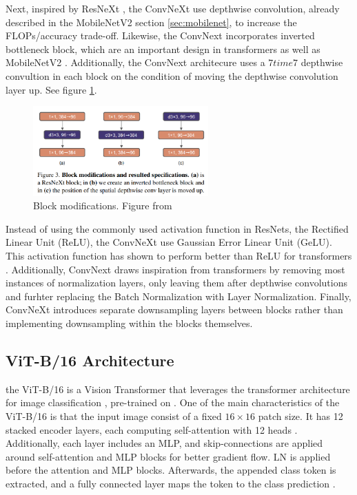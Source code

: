 Next, inspired by ResNeXt \cite{xie2017aggregatedresidualtransformationsdeep}, the ConvNeXt use depthwise convolution, already described in the MobileNetV2 section \ref{sec:mobilenet}, to increase the FLOPs/accuracy trade-off. Likewise, the ConvNext incorporates inverted bottleneck block, which are an important design in transformers as well as MobileNetV2 \cite{liu2022convnet2020s}. Additionally, the ConvNext architecure uses a $7 time 7$ depthwise convultion in each block on the condition of moving the depthwise convolution layer up. See figure \ref{fig:conv_block}.

\begin{figure}[h!]
    \centering
    \includegraphics[width=0.6\textwidth]{Images/convnext_block_mod.png} 
    \caption{Block modifications. Figure from \cite{liu2022convnet2020s} }
    \label{fig:conv_block}
\end{figure}

Instead of using the commonly used activation function in ResNets, the Rectified Linear Unit (ReLU), the ConvNeXt use Gaussian Error Linear Unit (GeLU). This activation function has shown to perform better than ReLU for transformers \cite{liu2022convnet2020s}. Additionally, ConvNext draws inspiration from transformers by removing most instances of normalization layers, only leaving them after depthwise convolutions and furhter replacing the Batch Normalization with Layer Normalization. Finally, ConvNeXt introduces separate downsampling layers between blocks rather than implementing downsampling within the blocks themselves. 


\subsection{ViT-B/16 Architecture}
\label{sec:vitb16}
the ViT-B/16 is a Vision Transformer that leverages the transformer architecture for image classification \cite{dosovitskiy2021imageworth16x16words}, pre-trained on . One of the main characteristics of the ViT-B/16 is that the input image consist of a fixed $16 \times 16$ patch size. It has 12 stacked encoder layers, each computing self-attention with 12 heads \cite{dosovitskiy2021imageworth16x16words}. Additionally, each layer includes an MLP, and skip-connections are applied around self-attention and MLP blocks for better gradient flow. LN is applied before the attention and MLP blocks. Afterwards, the appended class token is extracted, and a fully connected layer maps the token to the class prediction \cite{torchvision2024vitb16}. 






